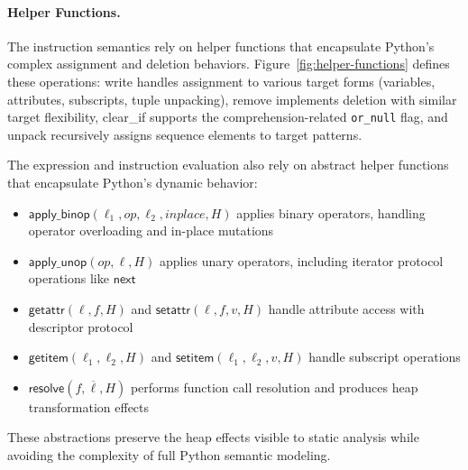 \paragraph{Helper Functions.}
The instruction semantics rely on helper functions that encapsulate Python's complex assignment and deletion behaviors. Figure~\ref{fig:helper-functions} defines these operations: \textsf{write} handles assignment to various target forms (variables, attributes, subscripts, tuple unpacking), \textsf{remove} implements deletion with similar target flexibility, \textsf{clear\_if} supports the comprehension-related \texttt{or\_null} flag, and \textsf{unpack} recursively assigns sequence elements to target patterns.

The expression and instruction evaluation also rely on abstract helper functions that encapsulate Python's dynamic behavior:
\begin{itemize}
\item $\mathsf{apply\_binop}(\ell_1,op,\ell_2,inplace,H)$ applies binary operators, handling operator overloading and in-place mutations
\item $\mathsf{apply\_unop}(op,\ell,H)$ applies unary operators, including iterator protocol operations like $\mathsf{next}$
\item $\mathsf{getattr}(\ell,f,H)$ and $\mathsf{setattr}(\ell,f,v,H)$ handle attribute access with descriptor protocol
\item $\mathsf{getitem}(\ell_1,\ell_2,H)$ and $\mathsf{setitem}(\ell_1,\ell_2,v,H)$ handle subscript operations
\item $\mathsf{resolve}(f,\overline{\ell},H)$ performs function call resolution and produces heap transformation effects
\end{itemize}
These abstractions preserve the heap effects visible to static analysis while avoiding the complexity of full Python semantic modeling.

